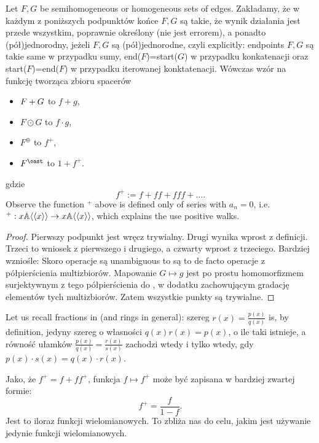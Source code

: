 \begin{df}
\begin{lm}
	Let $F,G$ be semihomogeneous or homogeneous sets of edges. Zakładamy, że w każdym z poniższych podpunktów końce $F, G$ są takie, że wynik działania jest przede wszystkim, poprawnie określony (nie jest errorem), a ponadto (pół)jednorodny, jeżeli $F,G$ są (pół)jednorodne, czyli explicitly: endpoints $F,G$ są takie same w przypadku sumy, end($F$)=start($G$) w przypadku konkatenacji oraz start($F$)=end($F$) w przypadku iterowanej konktatenacji.
	 Wówczas wzór na funkcję tworząca zbioru spacerów
	\begin{itemize}
		\item $F + G $ to $f+g$, 
		\item $F \odot G$ to $f\cdot g$,
		\item $F^\oplus $ to $f^+$,
		\item $F^{\oast}$ to $1 + f^+$.
	\end{itemize}
\end{lm}
gdzie
	$$
		f^+:=f + ff + fff + \ldots.
	$$
Observe the function $^+$ above is defined only of series with $a_n = 0$, i.e. $^+ : x \mathbb{ A } \langle\langle x \rangle\rangle  \rightarrow x \mathbb{ A } \langle\langle x \rangle\rangle $, which explains the use positive walks.
\begin{proof}
	Pierwszy podpunkt jest wręcz trywialny. Drugi wynika wprost z definicji. Trzeci to wniosek z pierwszego i drugiego, a czwarty wprost z trzeciego.
	Bardziej wzniośle: Skoro operacje są unambiguous to są to de facto operacje z półpierścienia multizbiorów. Mapowanie $G \mapsto g$ jest po prostu homomorfizmem surjektywnym z tego półpierścienia do \Ax, w dodatku zachowującym gradację elementów tych multizbiorów. Zatem wszystkie punkty są trywialne.
\end{proof}
%
%
Let us recall fractions in \Ax (and rings in general): szereg $r(x) = \frac{p(x)}{q(x)}$ is, by definition, jedyny szereg o własności $q(x)r(x) = p(x)$, o ile taki istnieje, a równość ułamków $\frac{p(x)}{q(x)} = \frac{r(x)}{s(x)}$ zachodzi wtedy i tylko wtedy, gdy $p(x) \cdot s(x)=q(x) \cdot r(x)$.

Jako, że $f^+ = f + ff^+$, funkcja $ f \mapsto f^+$ może być zapisana w bardziej zwartej formie:
\begin{equation}\label{eq::^+jestFunkcjaWymierna}
	f^+ = \frac{f}{1-f}.
\end{equation}
Jest to iloraz funkcji wielomianowych. To zbliża nas do celu, jakim jest używanie jedynie funkcji wielomianowych.
%
%

\end{df}
